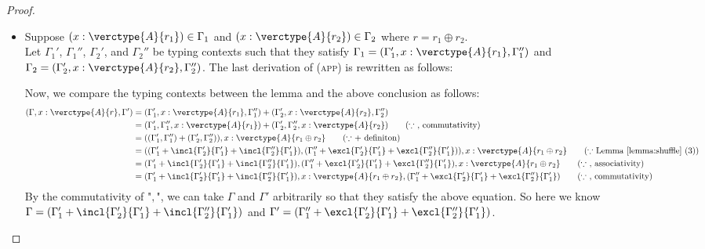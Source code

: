 \begin{proof}
\begin{itemize}
\begin{itemize}
\item Suppose $(x:\verctype{A}{r_1}) \in \Gamma_1$ and $(x:\verctype{A}{r_2}) \in \Gamma_2$ where $r=r_1\oplus r_2$.\\
Let $\Gamma_1'$, $\Gamma_1''$, $\Gamma_2'$, and $\Gamma_2''$ be typing contexts such that they satisfy $\Gamma_1 = (\Gamma_1', x:\verctype{A}{r_1}, \Gamma_1'')$ and $\Gamma_2 = (\Gamma_2', x:\verctype{A}{r_2}, \Gamma_2'')$.
The last derivation of (\textsc{app}) is rewritten as follows:
\begin{center}
    \begin{minipage}{.80\linewidth}
    \end{minipage}
\end{center}
Now, we compare the typing contexts between the lemma and the above conclusion as follows:
\begin{align*}
(\Gamma, x:\verctype{A}{r}, \Gamma')
    &= (\Gamma_1', x:\verctype{A}{r_1}, \Gamma_1'') + (\Gamma_2', x:\verctype{A}{r_2}, \Gamma_2'')\\
    &= (\Gamma_1', \Gamma_1'', x:\verctype{A}{r_1}) + (\Gamma_2', \Gamma_2'', x:\verctype{A}{r_2})\tag{$\because$ $,$ commutativity}\\
    &= ((\Gamma_1', \Gamma_1'') + (\Gamma_2', \Gamma_2'')), x:\verctype{A}{r_1\oplus r_2}\tag{$\because$ $+$ definiton}\\
    &= ((\Gamma_1'+\incl{\Gamma'_2}{\Gamma'_1}+\incl{\Gamma''_2}{\Gamma'_1}), (\Gamma''_1+\excl{\Gamma'_2}{\Gamma'_1}+\excl{\Gamma''_2}{\Gamma'_1})),x:\verctype{A}{r_1\oplus r_2}\tag{$\because$ Lemma \ref{lemma:shuffle} (3)}\\
    &= (\Gamma_1'+\incl{\Gamma'_2}{\Gamma'_1}+\incl{\Gamma''_2}{\Gamma'_1}), (\Gamma''_1+\excl{\Gamma'_2}{\Gamma'_1}+\excl{\Gamma''_2}{\Gamma'_1}), x:\verctype{A}{r_1\oplus r_2}\tag{$\because$ $,$ associativity}\\
    &= (\Gamma_1'+\incl{\Gamma'_2}{\Gamma'_1}+\incl{\Gamma''_2}{\Gamma'_1}),x:\verctype{A}{r_1\oplus r_2}, (\Gamma''_1+\excl{\Gamma'_2}{\Gamma'_1}+\excl{\Gamma''_2}{\Gamma'_1})\tag{$\because$ $,$ commutativity}
\end{align*}
By the commutativity of "$,$", we can take $\Gamma$ and $\Gamma'$ arbitrarily so that they satisfy the above equation. So here we know $\Gamma = (\Gamma_1'+\incl{\Gamma'_2}{\Gamma'_1}+\incl{\Gamma''_2}{\Gamma'_1})$ and $\Gamma' = (\Gamma''_1+\excl{\Gamma'_2}{\Gamma'_1}+\excl{\Gamma''_2}{\Gamma'_1})$.\par

\end{itemize}
\end{itemize}
\end{proof}
